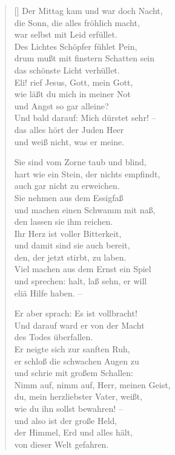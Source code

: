 \begin{multicols}{2}
\begin{verse}[\versewidth]
 Der Mittag kam und war doch Nacht,\\
die Sonn, die alles fröhlich macht,\\
war selbst mit Leid erfüllet.\\
Des Lichtes Schöpfer fühlet Pein,\\
drum mußt mit finstern Schatten sein\\
das schönste Licht verhüllet.\\
Eli! rief Jesus, Gott, mein Gott,\\
wie läßt du mich in meiner Not\\
und Angst so gar alleine?\\
Und bald darauf: Mich dürstet sehr! –\\
das alles hört der Juden Heer\\
und weiß nicht, was er meine.

 Sie sind vom Zorne taub und blind,\\
hart wie ein Stein, der nichts empfindt,\\
auch gar nicht zu erweichen.\\
Sie nehmen aus dem Essigfaß\\
und machen einen Schwamm mit naß,\\
den lassen sie ihm reichen.\\
Ihr Herz ist voller Bitterkeit,\\
und damit sind sie auch bereit,\\
den, der jetzt stirbt, zu laben.\\
Viel machen aus dem Ernst ein Spiel\\
und sprechen: halt, laß sehn, er will\\
eliä Hilfe haben. –

 Er aber sprach: Es ist vollbracht!\\
Und darauf ward er von der Macht\\
des Todes überfallen.\\
Er neigte sich zur sanften Ruh,\\
er schloß die schwachen Augen zu\\
und schrie mit großem Schallen:\\
Nimm auf, nimm auf, Herr, meinen Geist,\\
du, mein herzliebster Vater, weißt,\\
wie du ihn sollst bewahren! –\\
und also ist der große Held,\\
der Himmel, Erd und alles hält,\\
von dieser Welt gefahren.


\end{verse}
\end{multicols}
